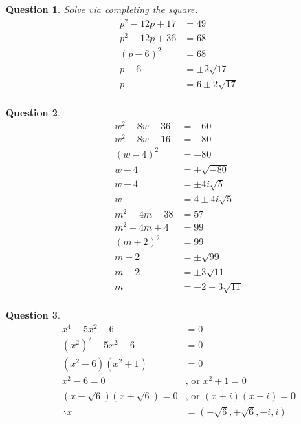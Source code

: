 \documentclass{amsart}
\newtheorem{question}{Question}
\begin{document}
	\begin{question}
		Solve via completing the square.
		\[\begin{aligned}
			p^2-12p+17&=49\\
			p^2-12p+36&=68\\
			(p-6)^2&=68\\%
			p-6&=\pm2\sqrt{17}\\
			p&=6\pm2\sqrt{17}\\
		\end{aligned}\]
	\end{question}
	\begin{question}
		\[\begin{aligned}
			w^2-8w+36&=-60\\
			w^2-8w+16&=-80\\
			(w-4)^2&=-80\\
			w-4&=\pm\sqrt{-80}\\
			w-4&=\pm4i\sqrt{5}\\
			w&=4\pm4i\sqrt{5}\\
			m^2+4m-38&=57\\
			m^2+4m+4&=99\\
			(m+2)^2&=99\\
			m+2&=\pm\sqrt{99}\\
			m+2&=\pm3\sqrt{11}\\
			m&=-2\pm3\sqrt{11}\\
		\end{aligned}\]
	\end{question}
	\begin{question}
		\[\begin{aligned}
			x^4-5x^2-6&=0\\
			(x^2)^2-5x^2-6&=0\\
			(x^2-6)(x^2+1)&=0\\
			x^2-6=0&\text{, or }x^2+1=0\\
			(x-\sqrt{6})(x+\sqrt{6})=0&\text{, or }(x+i)(x-i)=0
			\\
			\therefore x &= (-\sqrt{6}, +\sqrt{6}, -i, i)
		\end{aligned}\]
	\end{question}
\end{document}
